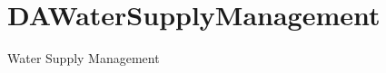 \chapter{DAWater\+Supply\+Management}
\hypertarget{index}{}\label{index}
\label{index_md__2_users_2antonioabilio_2_desktop_2_d_a_2proj-da-1_2_r_e_a_d_m_e}%
%
 Water Supply Management 